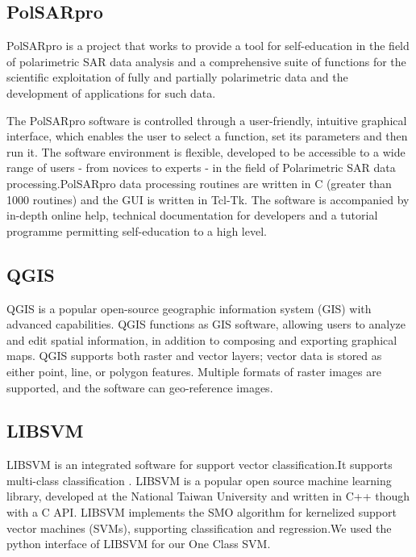 \subsection{PolSARpro}

PolSARpro is a project that works to provide a tool for self-education in the field of polarimetric SAR data analysis and a comprehensive suite of functions for the scientific exploitation of fully and partially polarimetric data and the development of applications for such data.

The PolSARpro software is controlled through a user-friendly, intuitive graphical interface, which enables the user to select a function, set its parameters and then run it. The software environment is flexible, developed to be accessible to a wide range of users - from novices to experts - in the field of Polarimetric SAR data processing.PolSARpro data processing routines are written in C (greater than 1000 routines) and the GUI is written in Tcl-Tk. The software is accompanied by in-depth online help, technical documentation for developers and a tutorial programme permitting self-education to a high level\cite{pottier2009overview}.


\subsection{QGIS}
QGIS is a popular open-source geographic information system (GIS) with advanced capabilities\cite{qgis2015qgis}. QGIS functions as GIS software, allowing users to analyze and edit spatial information, in addition to composing and exporting graphical maps. QGIS supports both raster and vector layers; vector data is stored as either point, line, or polygon features. Multiple formats of raster images are supported, and the software can geo-reference images.

\subsection{LIBSVM}
LIBSVM is an integrated software for support vector classification.It supports multi-class classification \cite{chang2011libsvm}. LIBSVM is a popular open source machine learning library, developed at the National Taiwan University and written in C++ though with a C API. LIBSVM implements the SMO algorithm for kernelized support vector machines (SVMs), supporting classification and regression.We used the python interface of LIBSVM for our One Class SVM.

